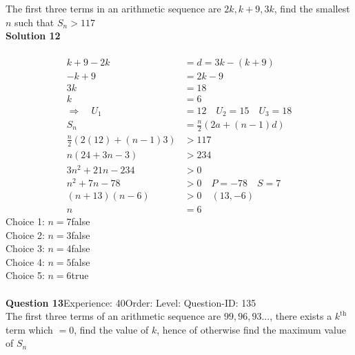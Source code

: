 \documentclass{article}
\begin{document}
The first three terms in an arithmetic sequence are $2k,k+9,3k$, find the smallest $n$ such that $S_n > 117$\\[4pt]
\noindent\textbf{Solution 12}\\[2pt]
\\[-35pt]\begin{align*}
k+9-2k&=d=3k-(k+9)\\[2pt]
-k+9&=2k-9\\[2pt]
3k&=18\\[2pt]
k&=6\\[12pt]
\Rightarrow\quad U_1&=12 \quad U_2=15 \quad U_3=18\\[2pt]
S_n&=\displaystyle\frac{n}{2}(2a+(n-1)d)\\[2pt]
\displaystyle\frac{n}{2}(2(12)+(n-1)3)&>117\\[2pt]
n(24+3n-3)&>234\\[2pt]
3n^2+21n-234&>0\\[2pt]
n^2+7n-78&>0\quad P=-78 \quad S=7\\[2pt]
(n+13)(n-6)&>0 \quad (13,-6)\\[2pt]
n&=6
\end{align*}
Choice 1: \hspace{20pt}$n=7$\hspace{20pt}false\\
Choice 2: \hspace{20pt}$n=3$\hspace{20pt}false\\
Choice 3: \hspace{20pt}$n=4$\hspace{20pt}false\\
Choice 4: \hspace{20pt}$n=5$\hspace{20pt}false\\
Choice 5: \hspace{20pt}$n=6$\hspace{20pt}true\\
\\[4pt]
\noindent\textbf{Question 13}\hspace{20pt}Experience: 40\hspace{20pt}Order: \hspace{20pt}Level: \hspace{20pt}Question-ID: 135\\[2pt]
The first three terms of an arithmetic sequence are $99,96,93...$, there exists a $k^{\text{th}}$ term which $=0$, find the value of $k$, hence of otherwise find the maximum value of $S_n$\\[4pt]
\end{document}
